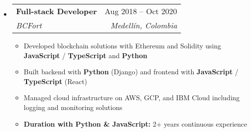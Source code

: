 \documentclass[letterpaper,11pt]{article}
\makeatletter
\newcommand{\resumeSubheading}[4]{
  \vspace{-2pt}
  \item[]
  \begin{tabular*}{\textwidth}{@{\extracolsep{\fill}}l r}
    \textbf{#1} & #2 \\
    \textit{#3} & \textit{#4} \\
  \end{tabular*}
  \vspace{-5pt}
}
\makeatother
\begin{document}
\begin{itemize}[leftmargin=0pt, itemindent=0pt, label={}, itemsep=1pt]
\resumeSubheading
{Full-stack Developer}{Aug 2018 -- Oct 2020}
{BCFort}{Medellín, Colombia}
\begin{itemize}[leftmargin=*, topsep=0pt, parsep=0pt, itemsep=0pt]
    \item Developed blockchain solutions with Ethereum and Solidity using \textbf{JavaScript} / \textbf{TypeScript} and \textbf{Python}
    \item Built backend with \textbf{Python} (Django) and frontend with \textbf{JavaScript} / \textbf{TypeScript} (React)
    \item Managed cloud infrastructure on AWS, GCP, and IBM Cloud including logging and monitoring solutions
    \item \textbf{Duration with Python \& JavaScript:} 2+ years continuous experience
\end{itemize}
\end{itemize}
\end{document}
